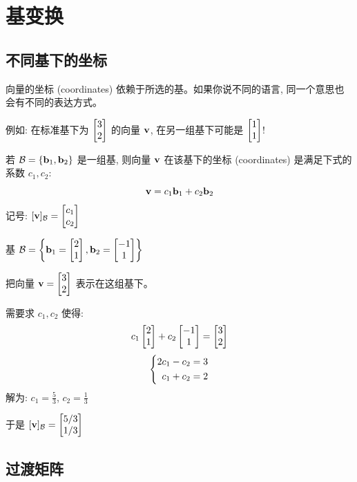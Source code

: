 
\chapter{基变换}
\label{ch:changebasis}

\begin{abstract}
同一个向量在不同基下有不同的坐标 (coordinates)。在本章中, 我们将学习如何在不同坐标系之间转换, 以及这一概念与矩阵的关系。
\end{abstract}

\section{不同基下的坐标}

\begin{intuition}
向量的坐标 (coordinates) 依赖于所选的基。如果你说不同的语言, 同一个意思也会有不同的表达方式。

例如: 在标准基下为 $\begin{bmatrix} 3 \\ 2 \end{bmatrix}$ 的向量 $\mathbf{v}$, 在另一组基下可能是 $\begin{bmatrix} 1 \\ 1 \end{bmatrix}$!
\end{intuition}

\begin{definition}[基下的坐标]
若 $\mathcal{B} = \{\mathbf{b}_1, \mathbf{b}_2\}$ 是一组基, 则向量 $\mathbf{v}$ 在该基下的坐标 (coordinates) 是满足下式的系数 $c_1, c_2$:
\[
\mathbf{v} = c_1 \mathbf{b}_1 + c_2 \mathbf{b}_2
\]
记号: $[\mathbf{v}]_{\mathcal{B}} = \begin{bmatrix} c_1 \\ c_2 \end{bmatrix}$
\end{definition}

\begin{example}
基 $\mathcal{B} = \left\{ \mathbf{b}_1 = \begin{bmatrix} 2 \\ 1 \end{bmatrix}, \mathbf{b}_2 = \begin{bmatrix} -1 \\ 1 \end{bmatrix} \right\}$

把向量 $\mathbf{v} = \begin{bmatrix} 3 \\ 2 \end{bmatrix}$ 表示在这组基下。

需要求 $c_1, c_2$ 使得:
\[
c_1 \begin{bmatrix} 2 \\ 1 \end{bmatrix} + c_2 \begin{bmatrix} -1 \\ 1 \end{bmatrix} = \begin{bmatrix} 3 \\ 2 \end{bmatrix}
\]
\[
\left\{\begin{aligned} 
2c_1 - c_2 &= 3 \\
c_1 + c_2 &= 2
 \end{aligned}\right.
\]
解为: $c_1 = \frac{5}{3}$, $c_2 = \frac{1}{3}$

于是 $[\mathbf{v}]_{\mathcal{B}} = \begin{bmatrix} 5/3 \\ 1/3 \end{bmatrix}$
\end{example}

\section{过渡矩阵}


